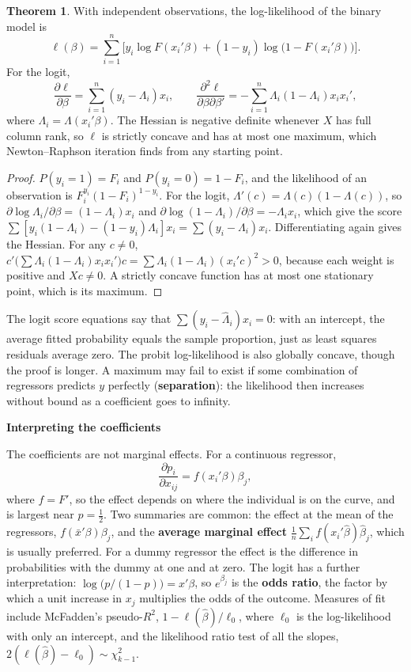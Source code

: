\documentclass[11pt,a4paper]{article}
\numberwithin{equation}{section}
\theoremstyle{definition}
\newtheorem{thm}{Theorem}[subsection]
\newcommand{\subhead}[1]{%
  \par\medskip\noindent\textbf{#1}\par\nobreak\smallskip}
\begin{document}
\begin{thm}
\label{thm:binary}
With independent observations, the log-likelihood of the binary model is
\[
\ell(\beta) = \sum_{i=1}^n\bigl[y_i\log F(x_i'\beta) + (1 - y_i)\log\bigl(1 - F(x_i'\beta)\bigr)\bigr] .
\]
For the logit,
\[
\frac{\partial\ell}{\partial\beta} = \sum_{i=1}^n(y_i - \Lambda_i)x_i, \qquad \frac{\partial^2\ell}{\partial\beta\partial\beta'} = -\sum_{i=1}^n\Lambda_i(1 - \Lambda_i)x_ix_i' ,
\]
where $\Lambda_i = \Lambda(x_i'\beta)$. The Hessian is negative definite whenever $X$ has full column rank, so $\ell$ is strictly concave and has at most one maximum, which
Newton--Raphson iteration finds from any starting point.
\end{thm}

\begin{proof}
$P(y_i = 1) = F_i$ and $P(y_i = 0) = 1 - F_i$, and the likelihood of an observation is $F_i^{y_i}(1 - F_i)^{1 - y_i}$. For the logit, $\Lambda'(c) = \Lambda(c)(1 - \Lambda(c))$, so
$\partial\log\Lambda_i/\partial\beta = (1 - \Lambda_i)x_i$ and $\partial\log(1 - \Lambda_i)/\partial\beta = -\Lambda_ix_i$, which give the score $\sum[y_i(1 - \Lambda_i) - (1 - y_i)\Lambda_i]x_i = \sum(y_i - \Lambda_i)x_i$. Differentiating again gives
the Hessian. For any $c \neq 0$, $c'\bigl(\sum\Lambda_i(1 - \Lambda_i)x_ix_i'\bigr)c = \sum\Lambda_i(1 - \Lambda_i)(x_i'c)^2 > 0$, because each weight is positive and $Xc \neq 0$. A strictly concave function has at
most one stationary point, which is its maximum.
\end{proof}

The logit score equations say that $\sum(y_i - \hat\Lambda_i)x_i = 0$: with an intercept, the average fitted probability equals the sample proportion, just as least squares
residuals average zero. The probit log-likelihood is also globally concave, though the proof is longer. A maximum may fail to exist if some
combination of regressors predicts $y$ perfectly (\textbf{separation}): the likelihood then increases without bound as a coefficient goes to infinity.

\subhead{Interpreting the coefficients}
The coefficients are not marginal effects. For a continuous regressor,
\[
\frac{\partial p_i}{\partial x_{ij}} = f(x_i'\beta)\beta_j ,
\]
where $f = F'$, so the effect depends on where the individual is on the curve, and is largest near $p = \frac12$. Two summaries are common: the effect at the
mean of the regressors, $f(\bar x'\beta)\beta_j$, and the \textbf{average marginal effect} $\frac1n\sum_if(x_i'\hat\beta)\hat\beta_j$, which is usually preferred. For a dummy regressor the
effect is the difference in probabilities with the dummy at one and at zero. The logit has a further interpretation: $\log\bigl(p/(1 - p)\bigr) = x'\beta$, so $e^{\beta_j}$ is
the \textbf{odds ratio}, the factor by which a unit increase in $x_j$ multiplies the odds of the outcome. Measures of fit include McFadden's pseudo-$R^2$,
$1 - \ell(\hat\beta)/\ell_0$, where $\ell_0$ is the log-likelihood with only an intercept, and the likelihood ratio test of all the slopes, $2(\ell(\hat\beta) - \ell_0) \sim \chi^2_{k-1}$.
\end{document}

